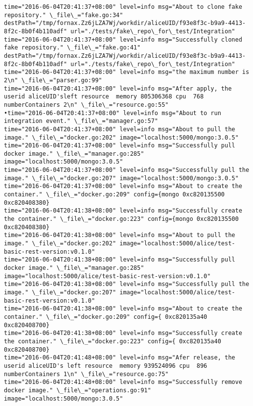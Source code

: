 \begin{lstlisting}[caption={Fornax功能性测试日志}]
time="2016-06-04T20:41:37+08:00" level=info msg="About to clone fake repository." \_file\_="fake.go:34" destPath="/tmp/fornax.Zz6jLZA7Wj/workdir/aliceUID/f93e8f3c-b9a9-4413-8f2c-8b0f4b110adf" url="./tests/fake\_repo\_for\_test/Integration" 
time="2016-06-04T20:41:37+08:00" level=info msg="Successfully cloned fake repository." \_file\_="fake.go:41" destPath="/tmp/fornax.Zz6jLZA7Wj/workdir/aliceUID/f93e8f3c-b9a9-4413-8f2c-8b0f4b110adf" url="./tests/fake\_repo\_for\_test/Integration" 
time="2016-06-04T20:41:37+08:00" level=info msg="the maximum number is 2\n" \_file\_="parser.go:99" 
time="2016-06-04T20:41:37+08:00" level=info msg="After apply, the userid aliceUID'sleft resource  memory 805306368 cpu  768 numberContainers 2\n" \_file\_="resource.go:55" 
•time="2016-06-04T20:41:37+08:00" level=info msg="About to run integration event." \_file\_="manager.go:57" 
time="2016-06-04T20:41:37+08:00" level=info msg="About to pull the image." \_file\_="docker.go:202" image="localhost:5000/mongo:3.0.5" 
time="2016-06-04T20:41:37+08:00" level=info msg="Successfully pull docker image." \_file\_="manager.go:285" image="localhost:5000/mongo:3.0.5" 
time="2016-06-04T20:41:37+08:00" level=info msg="Successfully pull the image." \_file\_="docker.go:207" image="localhost:5000/mongo:3.0.5" 
time="2016-06-04T20:41:37+08:00" level=info msg="About to create the container." \_file\_="docker.go:209" config={mongo 0xc820135500 0xc820408380} 
time="2016-06-04T20:41:38+08:00" level=info msg="Successfully create the container." \_file\_="docker.go:223" config={mongo 0xc820135500 0xc820408380} 
time="2016-06-04T20:41:38+08:00" level=info msg="About to pull the image." \_file\_="docker.go:202" image="localhost:5000/alice/test-basic-rest-version:v0.1.0" 
time="2016-06-04T20:41:38+08:00" level=info msg="Successfully pull docker image." \_file\_="manager.go:285" image="localhost:5000/alice/test-basic-rest-version:v0.1.0" 
time="2016-06-04T20:41:38+08:00" level=info msg="Successfully pull the image." \_file\_="docker.go:207" image="localhost:5000/alice/test-basic-rest-version:v0.1.0" 
time="2016-06-04T20:41:38+08:00" level=info msg="About to create the container." \_file\_="docker.go:209" config={ 0xc820135a40 0xc820408700} 
time="2016-06-04T20:41:38+08:00" level=info msg="Successfully create the container." \_file\_="docker.go:223" config={ 0xc820135a40 0xc820408700} 
time="2016-06-04T20:41:48+08:00" level=info msg="Afer release, the userid aliceUID's left resource  memory 939524096 cpu  896 numberContainers 1\n" \_file\_="resource.go:75" 
time="2016-06-04T20:41:48+08:00" level=info msg="Successfully remove docker image." \_file\_="operations.go:91" image="localhost:5000/mongo:3.0.5" 

\end{lstlisting}
